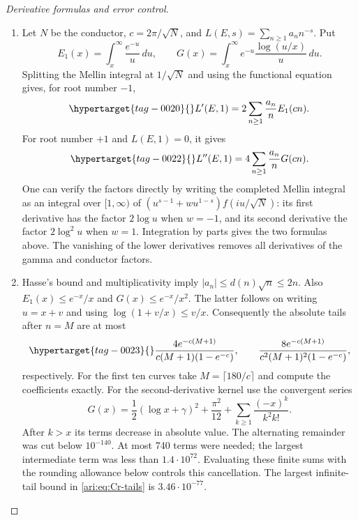 \begin{proof}[Derivative formulas and error control]

\begin{enumerate}[label=\arabic*.,leftmargin=*]
\item Let $N$ be the conductor, $c=2\pi/\sqrt N$, and
$L(E,s)=\sum_{n\geq1}a_nn^{-s}$. Put
\[
 E_1(x)=\int_x^\infty\frac{e^{-u}}u\,du,
 \qquad G(x)=\int_x^\infty e^{-u}\frac{\log(u/x)}u\,du.
\]
Splitting the Mellin integral at $1/\sqrt N$ and using the functional
equation gives, for root number $-1$,
\begin{equation}\hypertarget{tag-0020}{}\label{ari:eq:Cr-first}
 L'(E,1)=2\sum_{n\geq1}\frac{a_n}{n}E_1(cn).
\end{equation}
For root number $+1$ and $L(E,1)=0$, it gives
\begin{equation}\hypertarget{tag-0022}{}\label{ari:eq:Cr-second}
 L''(E,1)=4\sum_{n\geq1}\frac{a_n}{n}G(cn).
\end{equation}
One can verify the factors directly by writing the completed Mellin
integral as an integral over $[1,\infty)$ of
$(u^{s-1}+wu^{1-s})f(iu/\sqrt N)$: its first derivative has
the factor $2\log u$ when $w=-1$, and its second derivative
the factor $2\log^2u$ when $w=1$. Integration by parts gives
the two formulas above. The vanishing of the lower derivatives
removes all derivatives of the gamma and conductor factors.

\item Hasse's bound and multiplicativity imply
$|a_n|\leq d(n)\sqrt n\leq2n$. Also
$E_1(x)\leq e^{-x}/x$ and $G(x)\leq e^{-x}/x^2$.
The latter follows on writing $u=x+v$ and using
$\log(1+v/x)\leq v/x$. Consequently the absolute tails after
$n=M$ are at most
\begin{equation}\hypertarget{tag-0023}{}\label{ari:eq:Cr-tails}
 \frac{4e^{-c(M+1)}}{c(M+1)(1-e^{-c})},\qquad
 \frac{8e^{-c(M+1)}}{c^2(M+1)^2(1-e^{-c})},
\end{equation}
respectively. For the first ten curves take
$M=\lceil180/c\rceil$ and compute the coefficients exactly.
For the second-derivative kernel use the convergent series
\[
 G(x)=\frac12(\log x+\gamma)^2+\frac{\pi^2}{12}
       +\sum_{k\geq1}\frac{(-x)^k}{k^2k!}.
\]
After $k>x$ its terms decrease in absolute value. The alternating
remainder was cut below $10^{-140}$. At most 740 terms were needed;
the largest intermediate term was less than $1.4\cdot10^{72}$.
Evaluating these finite sums with the rounding allowance below
controls this cancellation. The largest infinite-tail bound in
\eqref{ari:eq:Cr-tails} is $3.46\cdot10^{-77}$.


\end{enumerate}
\end{proof}
